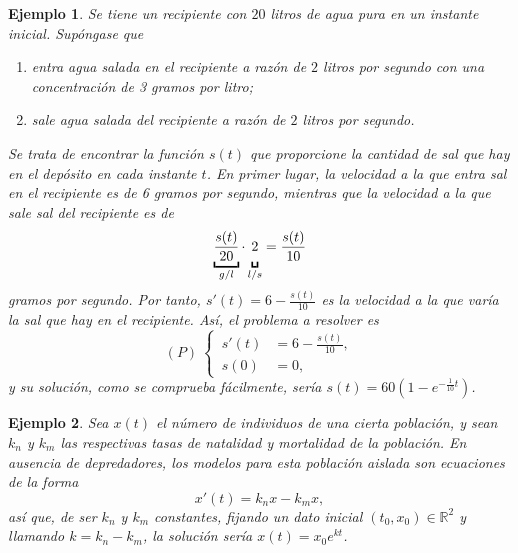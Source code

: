 \documentclass[11pt]{report}
\theoremstyle{mytheorem}
\theoremstyle{mydefinition}
\theoremstyle{myexample}
\newtheorem*{example}{Ejemplo}
\newcommand{\R}{\mathbb R}
\begin{document}
\begin{example}
Se tiene un recipiente con $20$ litros de agua pura en un instante inicial. Supóngase que 
\begin{enumerate}
    \item entra agua salada en el recipiente a razón de $2$ litros por segundo con una concentración de 3 gramos por litro;
    \item sale agua salada del recipiente a razón de $2$ litros por segundo.
\end{enumerate}

Se trata de encontrar la función $s(t)$ que proporcione la cantidad de sal que hay en el depósito en cada instante $t$. En primer lugar, la velocidad a la que entra sal en el recipiente es de 6 gramos por segundo, mientras que la velocidad a la que sale sal del recipiente es de
\[\underbracket{\frac{s(t)}{20}}_{g/l} \cdot \underbracket{\vphantom{\frac{}{}}2}_{l/s} = \frac{s(t)}{10}\]
gramos por segundo. Por tanto, $s'(t)=6-\frac{s(t)}{10}$ es la velocidad a la que varía la sal que hay en el recipiente. Así, el problema a resolver es
\[(P) \ \left\{
\begin{alignedat}{1}
\, s'(t)&=6-\frac{s(t)}{10}, \\
\, s(0)&=0,
\end{alignedat}\right.\]
y su solución, como se comprueba fácilmente, sería $s(t)=60(1-e^{-\frac{1}{10}t})$.
\end{example}

\begin{example}
Sea $x(t)$ el número de individuos de una cierta población, y sean $k_n$ y $k_m$ las respectivas tasas de natalidad y mortalidad de la población. En ausencia de depredadores, los modelos para esta población aislada son ecuaciones de la forma
\[x'(t)=k_nx-k_mx,\]
así que, de ser $k_n$ y $k_m$ constantes, fijando un dato inicial $(t_0,x_0) \in \R^2$ y llamando $k= k_n-k_m$, la solución sería $x(t)=x_0e^{kt}$.
\end{example}
\end{document}
